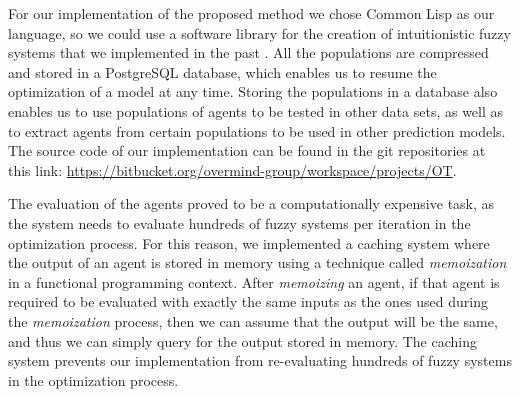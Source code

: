 ﻿\documentclass{ieeeaccess}
\begin{document}
For our implementation of the proposed method we chose Common Lisp as
our language, so we could use a software library for the creation of
intuitionistic fuzzy systems that we implemented in the past
\cite{Hernandez-Aguila2016} \cite{Hernandez-Aguila2017-2}. All the
populations are compressed and stored in a PostgreSQL database, which
enables us to resume the optimization of a model at any time. Storing
the populations in a database also enables us to use populations of
agents to be tested in other data sets, as well as to extract agents
from certain populations to be used in other prediction models. The
source code of our implementation can be found in the git repositories
at this link:
\url{https://bitbucket.org/overmind-group/workspace/projects/OT}.

The evaluation of the agents proved to be a computationally expensive
task, as the system needs to evaluate hundreds of fuzzy systems per
iteration in the optimization process. For this reason, we implemented
a caching system where the output of an agent is stored in memory
using a technique called \textit{memoization}
\cite{johnson1995memoization} in a functional programming
context. After \textit{memoizing} an agent, if that agent is required
to be evaluated with exactly the same inputs as the ones used during
the \textit{memoization} process, then we can assume that the output
will be the same, and thus we can simply query for the output stored
in memory. The caching system prevents our implementation from
re-evaluating hundreds of fuzzy systems in the optimization process.



\end{document}
